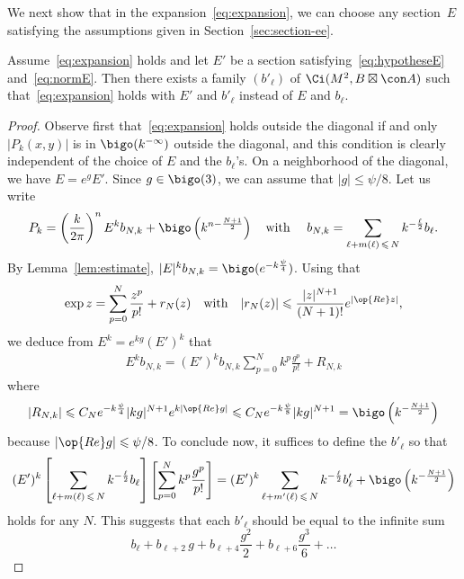 We next show that in the expansion~\eqref{eq:expansion}, we can choose any section~$E$ satisfying the assumptions given in Section~\ref{sec:section-ee}.

\begin{lemm}\label{lem:changement_E}
Assume~\eqref{eq:expansion} holds and let $E'$ be a section satisfying~\eqref{eq:hypotheseE} and~\eqref{eq:normE}. Then there exists a family $(b'_{\ell})$ of $\Ci (M^2, B \boxtimes \con A)$ such that~\eqref{eq:expansion} holds with $E'$ and $b'_{\ell}$ instead of $E$ and $b_{\ell}$.
\end{lemm}

\begin{proof}
Observe first that~\eqref{eq:expansion} holds outside the diagonal if and only $|P_k (x,y)|$ is in $\bigo (k^{-\infty})$ outside the diagonal, and this condition is clearly independent of the choice of $E$ and the $b_{\ell}$'s. On a neighborhood of the diagonal, we have $E = e^{g} E'$. Since $g \in \bigo (3)$, we can assume that  $|g| \leqslant \psi/8$.  Let us write
\[
P_k = \left(\frac{k}{2 \pi}\right)^n E^k
b_{N,k} + \bigo \left(k^{n- \frac{N+1}{2}}\right) \quad \text{with } \quad b_{N,k} = \sum_{\ell + m (\ell)
\,\leqslant\,N} k^{-\frac{\ell}{2}}b_{\ell}.
\]
By Lemma~\ref{lem:estimate},  $|E|^k b_{N,k} = \bigo (e^{-k \frac{\psi}{4}})$.  Using that
\[
\exp z = \sum_{p = 0 }^N \frac{z^p }{p!} + r_N (z) \quad \text{with} \quad |r_{N} (z) | \leqslant \frac{|z|^{N+1} }{ (N+1)!} e^{|\op{Re} z |},
\]
we deduce from $E^k = e^{kg } (E')^k$ that
\begin{gather}\label{eq:fin}
E^k b_{N,k} = (E')^k b_{N,k} \sum_{p = 0 }^N k^p \frac{g^p}{p!} + R_{N,k}
\end{gather}
where 
\[
| R_{N,k} | \leqslant C_N e^{-k \frac{\psi}{4} } |kg|^{N+1} e^{ k
|\op{Re} g |} \leqslant C_N e^{-k \frac{\psi}{8} }
|kg|^{N+1} = \bigo \left(k^{- \frac{N+1}{2}}\right)
\]
because $|\op{Re} g | \leqslant \psi/8$.  To conclude now, it suffices to define the $b'_{\ell}$ so that
\begin{gather}\label{eq:last_goal}
(E')^k \left[\sum_{\ell + m (\ell)
\,\leqslant\,N} k^{-\frac{\ell}{2}}b_{\ell} \right] \left[\sum_{p = 0 }^N k^p \frac{g^p}{p!} \right]= (E')^k \sum_{\ell + m ' (\ell)\,\leqslant\,N} k^{- \frac{\ell}{2}} b'_{\ell} + \bigo \left(k^{-\frac{N+1}{2}}\right)
\end{gather}
holds for any $N$. This suggests that each $b'_{\ell}$ should be equal to the infinite sum
\[
b_{\ell}
+ b_{\ell +2 } \, g + b_{\ell +4 } \frac{g^2}{2} + b_{\ell+ 6} \frac{g^3}{6}
+\ldots
\]
\end{proof}
